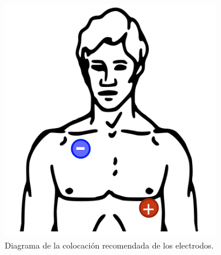 \documentclass[conference]{IEEEtran}
\begin{document}
\begin{figure}[t]
    \centering
    \includegraphics[width=0.5\linewidth]{figs/ubiacion_electrodos.png}
    \caption{Diagrama de la colocación recomendada de los electrodos.}
    \label{fig:ubicacion_electrodos}
\end{figure}





\end{document}
